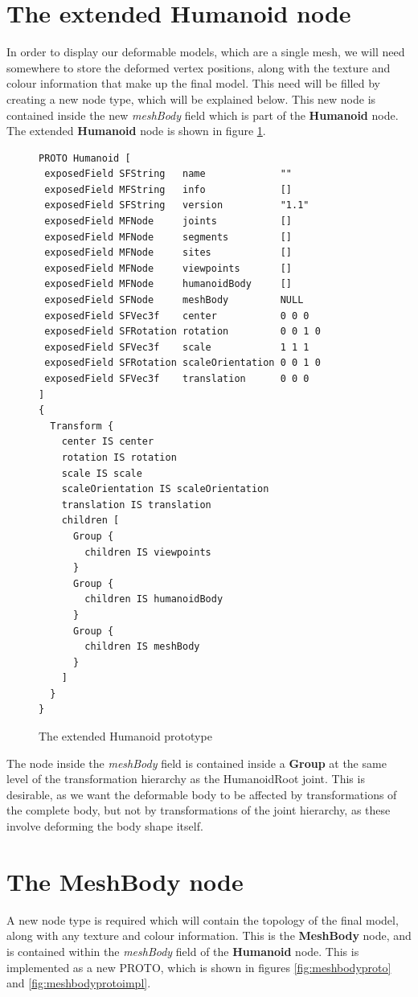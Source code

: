 \documentclass[12pt,oneside,a4paper,titlepage]{article}
\begin{document}
\section{\label{sec:humanoid}The extended Humanoid node}
In order to display our deformable models, which are a single mesh, we will need somewhere to store the deformed vertex positions, along with the texture and colour information that make up the final model. This need will be filled by creating a new node type, which will be explained below. This new node is contained inside the new {\it meshBody} field which is part of the {\bf Humanoid} node. The extended {\bf Humanoid} node is shown in figure \ref{fig:humanoidproto}.

\begin{figure}[th]
\scriptsize
\begin{verbatim}
PROTO Humanoid [
 exposedField SFString   name             ""
 exposedField MFString   info             []
 exposedField SFString   version          "1.1"
 exposedField MFNode     joints           []
 exposedField MFNode     segments         []
 exposedField MFNode     sites            []
 exposedField MFNode     viewpoints       []
 exposedField MFNode     humanoidBody     []
 exposedField SFNode     meshBody         NULL
 exposedField SFVec3f    center           0 0 0
 exposedField SFRotation rotation         0 0 1 0
 exposedField SFVec3f    scale            1 1 1
 exposedField SFRotation scaleOrientation 0 0 1 0
 exposedField SFVec3f    translation      0 0 0
]
{
  Transform {
    center IS center
    rotation IS rotation
    scale IS scale
    scaleOrientation IS scaleOrientation
    translation IS translation
    children [
      Group {
        children IS viewpoints
      }
      Group {
        children IS humanoidBody
      }
      Group {
        children IS meshBody
      }
    ]
  }
}
\end{verbatim}
\caption{\label{fig:humanoidproto} The extended Humanoid prototype}
\end{figure}

The node inside the {\it meshBody} field is contained inside a {\bf Group} at the same level of the transformation hierarchy as the HumanoidRoot joint. This is desirable, as we want the deformable body to be affected by transformations of the complete body, but not by transformations of the joint hierarchy, as these involve deforming the body shape itself.

\section{\label{sec:meshbody}The MeshBody node}
A new node type is required which will contain the topology of the final model, along with any texture and colour information. This is the {\bf MeshBody} node, and is contained within the {\it meshBody} field of the {\bf Humanoid} node. This is implemented as a new PROTO, which is shown in figures \ref{fig:meshbodyproto} and \ref{fig:meshbodyprotoimpl}.
\end{document}
